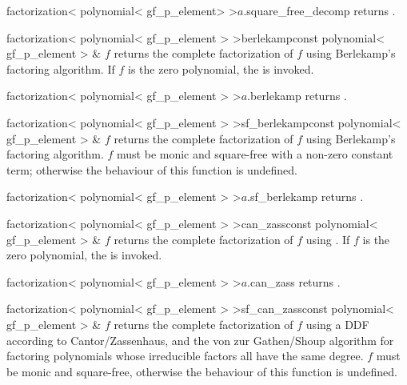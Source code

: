 \begin{cfcode}{factorization< polynomial< gf_p_element> >}{$a$.square_free_decomp}{}
  returns .
\end{cfcode}



\begin{fcode}{factorization< polynomial< gf_p_element > >}{berlekamp}{const polynomial<
    gf_p_element > & $f$}%
  returns the complete factorization of $f$ using Berlekamp's factoring algorithm.  If $f$ is
  the zero polynomial, the \LEH is invoked.
\end{fcode}

\begin{cfcode}{factorization< polynomial< gf_p_element > >}{$a$.berlekamp}{}
  returns .
\end{cfcode}

\begin{fcode}{factorization< polynomial< gf_p_element > >}{sf_berlekamp}{const polynomial<
    gf_p_element > & $f$}%
  returns the complete factorization of $f$ using Berlekamp's factoring algorithm.  $f$ must be
  monic and square-free with a non-zero constant term; otherwise the behaviour of this function
  is undefined.
\end{fcode}

\begin{cfcode}{factorization< polynomial< gf_p_element > >}{$a$.sf_berlekamp}{}
  returns .
\end{cfcode}



\begin{fcode}{factorization< polynomial< gf_p_element > >}{can_zass}{const polynomial<
    gf_p_element > & $f$}%
  returns the complete factorization of $f$ using .  If $f$ is the zero
  polynomial, the \LEH is invoked.
\end{fcode}

\begin{cfcode}{factorization< polynomial< gf_p_element > >}{$a$.can_zass}{}
  returns .
\end{cfcode}

\begin{fcode}{factorization< polynomial< gf_p_element > >}{sf_can_zass}{const polynomial<
    gf_p_element > & $f$}%
  returns the complete factorization of $f$ using a DDF according to Cantor/Zassenhaus, and the
  von zur Gathen/Shoup algorithm for factoring polynomials whose irreducible factors all have
  the same degree.  $f$ must be monic and square-free, otherwise the behaviour of this function
  is undefined.
\end{fcode}

